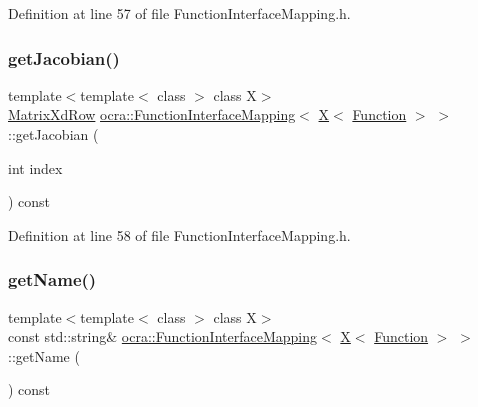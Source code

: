 Definition at line 57 of file Function\+Interface\+Mapping.\+h.

\hypertarget{structocra_1_1FunctionInterfaceMapping_3_01X_3_01Function_01_4_01_4_a65d422e9ec5829299f0485e78391d4b6}{}\label{structocra_1_1FunctionInterfaceMapping_3_01X_3_01Function_01_4_01_4_a65d422e9ec5829299f0485e78391d4b6} 
\subsubsection{\texorpdfstring{get\+Jacobian()}{getJacobian()}\hspace{0.1cm}{\footnotesize\ttfamily [2/2]}}
{\footnotesize\ttfamily template$<$template$<$ class $>$ class X$>$ \\
\hyperlink{namespaceocra_a608bf0522317ed1df3bbfc6a5753bc01}{Matrix\+Xd\+Row} \hyperlink{structocra_1_1FunctionInterfaceMapping}{ocra\+::\+Function\+Interface\+Mapping}$<$ \hyperlink{namespaceocra_a436781c7059a0f76027df1c652126260a53f3cfeeb322946db40cd86dfebfb237}{X}$<$ \hyperlink{classocra_1_1Function}{Function} $>$ $>$\+::get\+Jacobian (\begin{DoxyParamCaption}\item[{int}]{index }\end{DoxyParamCaption}) const\hspace{0.3cm}{\ttfamily [inline]}}



Definition at line 58 of file Function\+Interface\+Mapping.\+h.

\hypertarget{structocra_1_1FunctionInterfaceMapping_3_01X_3_01Function_01_4_01_4_af2bb88848088abbb7ddb9dccb267fd0d}{}\label{structocra_1_1FunctionInterfaceMapping_3_01X_3_01Function_01_4_01_4_af2bb88848088abbb7ddb9dccb267fd0d} 
\subsubsection{\texorpdfstring{get\+Name()}{getName()}}
{\footnotesize\ttfamily template$<$template$<$ class $>$ class X$>$ \\
const std\+::string\& \hyperlink{structocra_1_1FunctionInterfaceMapping}{ocra\+::\+Function\+Interface\+Mapping}$<$ \hyperlink{namespaceocra_a436781c7059a0f76027df1c652126260a53f3cfeeb322946db40cd86dfebfb237}{X}$<$ \hyperlink{classocra_1_1Function}{Function} $>$ $>$\+::get\+Name (\begin{DoxyParamCaption}{ }\end{DoxyParamCaption}) const\hspace{0.3cm}{\ttfamily [inline]}}




